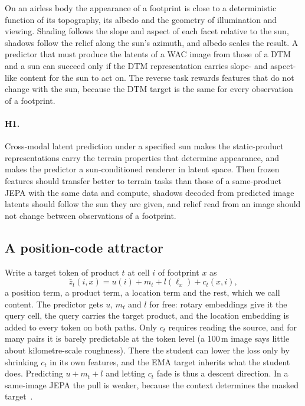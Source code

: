 On an airless body the appearance of a footprint is close to a deterministic function of its topography, its albedo and the geometry of illumination and viewing. Shading follows the slope and aspect of each facet relative to the sun, shadows follow the relief along the sun's azimuth, and albedo scales the result. A predictor that must produce the latents of a WAC image from those of a DTM and a sun can succeed only if the DTM representation carries slope- and aspect-like content for the sun to act on. The reverse task rewards features that do not change with the sun, because the DTM target is the same for every observation of a footprint.

\paragraph{H1.} Cross-modal latent prediction under a specified sun makes the static-product representations carry the terrain properties that determine appearance, and makes the predictor a sun-conditioned renderer in latent space. Then frozen features should transfer better to terrain tasks than those of a same-product JEPA with the same data and compute, shadows decoded from predicted image latents should follow the sun they are given, and relief read from an image should not change between observations of a footprint.

\subsection{A position-code attractor}
\label{sec:h2}

Write a target token of product $t$ at cell $i$ of footprint $x$ as
\begin{equation}
  \bar z_t(i, x) = u(i) + m_t + l(\ell_x) + c_t(x, i),
  \label{eq:decomp}
\end{equation}
a position term, a product term, a location term and the rest, which we call content. The predictor gets $u$, $m_t$ and $l$ for free: rotary embeddings give it the query cell, the query carries the target product, and the location embedding is added to every token on both paths. Only $c_t$ requires reading the source, and for many pairs it is barely predictable at the token level (a 100\,m image says little about kilometre-scale roughness). There the student can lower the loss only by shrinking $c_t$ in its own features, and the EMA target inherits what the student does. Predicting $u{+}m_t{+}l$ and letting $c_t$ fade is thus a descent direction. In a same-image JEPA the pull is weaker, because the context determines the masked target~\cite{assran2023self,bardes2024revisiting}.

